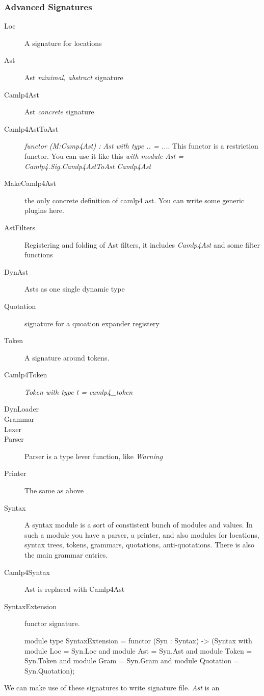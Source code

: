 \subsubsection{Advanced Signatures}

\begin{description}
\item[Loc] A signature for locations
\item[Ast] Ast \textit{minimal, abstract} signature
\item[Camlp4Ast] Ast \textit{concrete} signature
\item[Camlp4AstToAst]
  \textit{functor (M:Camp4Ast) : Ast with  type .. = ...}. This
  functor is a restriction functor. You can use it like this
  \textit{with module Ast = Camlp4.Sig.Camlp4AstToAst Camlp4Ast}

\item[MakeCamlp4Ast] the only concrete definition of camlp4 ast. You
  can write some generic plugins here.
\item[AstFilters] Registering and folding of Ast filters, it includes
  \textit{Camlp4Ast} and some filter functions

\item[DynAst] Asts as one single dynamic type

\item[Quotation] signature for a quoation expander registery
\item[Token] A signature around tokens.
\item[Camlp4Token] \textit{Token with type t = camlp4\_token}
\item[DynLoader]
\item[Grammar]
\item[Lexer]
\item[Parser] Parser is a type lever function, like \textit{Warning}
\item[Printer] The same as above

\item[Syntax] A syntax module is a sort of constistent bunch of
  modules and values.  In such a module you have a parser, a printer,
  and also modules for locations, syntax trees, tokens, grammars,
  quotations, anti-quotations.  There is also the main grammar
  entries.
\item[Camlp4Syntax] Ast is replaced with Camlp4Ast
\item[SyntaxExtension] functor signature.

  \begin{ocamlcode}
module type SyntaxExtension = functor (Syn : Syntax)
                    -> (Syntax with module Loc            = Syn.Loc
                                and module Ast            = Syn.Ast
                                and module Token          = Syn.Token
                                and module Gram           = Syn.Gram
                                and module Quotation      = Syn.Quotation);
    
  \end{ocamlcode}
\end{description}
We can make use of these signatures to write signature file.
\textit{Ast} is an


